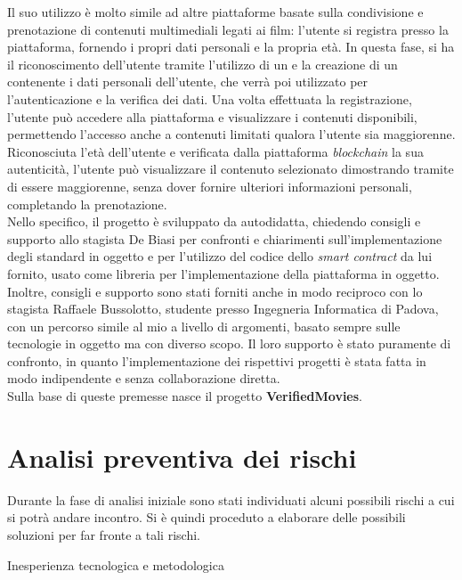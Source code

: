 Il suo utilizzo è molto simile ad altre piattaforme basate sulla condivisione e prenotazione di contenuti multimediali legati ai film:
l'utente si registra presso la piattaforma, fornendo i propri dati personali e la propria età. In questa fase, si ha il riconoscimento dell'utente
tramite l'utilizzo di un  e la creazione di un  contenente i dati personali dell'utente, che verrà poi utilizzato per l'autenticazione
e la verifica dei dati. Una volta effettuata la registrazione, l'utente può accedere alla piattaforma e visualizzare i contenuti disponibili, permettendo l'accesso
anche a contenuti limitati qualora l'utente sia maggiorenne. Riconosciuta l'età dell'utente e verificata dalla piattaforma \textit{blockchain} la sua autenticità,
l'utente può visualizzare il contenuto selezionato dimostrando tramite  di essere maggiorenne, senza dover fornire ulteriori informazioni personali,
completando la prenotazione. \\

Nello specifico, il progetto è sviluppato da autodidatta, chiedendo consigli e supporto allo stagista De Biasi per confronti e chiarimenti sull'implementazione degli standard in oggetto
e per l'utilizzo del codice dello \textit{smart contract} da lui fornito, usato come libreria per l'implementazione della piattaforma in oggetto.
Inoltre, consigli e supporto sono stati forniti anche in modo reciproco con lo stagista Raffaele Bussolotto, studente presso Ingegneria Informatica di Padova,
con un percorso simile al mio a livello di argomenti, basato sempre sulle tecnologie in oggetto ma con diverso scopo. 
Il loro supporto è stato puramente di confronto, in quanto l'implementazione dei rispettivi progetti è stata fatta in modo indipendente e senza collaborazione diretta. \\
Sulla base di queste premesse nasce il progetto \textbf{VerifiedMovies}.

\section{Analisi preventiva dei rischi}\label{sec:analisi-rischi}

Durante la fase di analisi iniziale sono stati individuati alcuni possibili rischi 
a cui si potrà andare incontro. Si è quindi proceduto a elaborare delle possibili soluzioni per far fronte a tali rischi. \\

\begin{risk}{Inesperienza tecnologica e metodologica} 
    \newline
    \label{risk:inesperienza-tecnologica} 
\end{risk}

